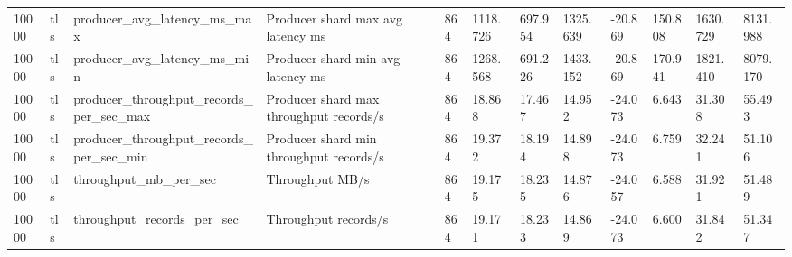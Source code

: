 \begin{longtable}{llllllllllll}
10000 & tls & producer\_avg\_latency\_ms\_max & Producer shard max avg latency ms & 864 & 1118.726 & 697.954 & 1325.639 & -20.869 & 150.808 & 1630.729 & 8131.988 \\
10000 & tls & producer\_avg\_latency\_ms\_min & Producer shard min avg latency ms & 864 & 1268.568 & 691.226 & 1433.152 & -20.869 & 170.941 & 1821.410 & 8079.170 \\
10000 & tls & producer\_throughput\_records\_per\_sec\_max & Producer shard max throughput records/s & 864 & 18.868 & 17.467 & 14.952 & -24.073 & 6.643 & 31.308 & 55.493 \\
10000 & tls & producer\_throughput\_records\_per\_sec\_min & Producer shard min throughput records/s & 864 & 19.372 & 18.194 & 14.898 & -24.073 & 6.759 & 32.241 & 51.106 \\
10000 & tls & throughput\_mb\_per\_sec & Throughput MB/s & 864 & 19.175 & 18.235 & 14.876 & -24.057 & 6.588 & 31.921 & 51.489 \\
10000 & tls & throughput\_records\_per\_sec & Throughput records/s & 864 & 19.171 & 18.233 & 14.869 & -24.073 & 6.600 & 31.842 & 51.347 \\
\hline
\end{longtable}
